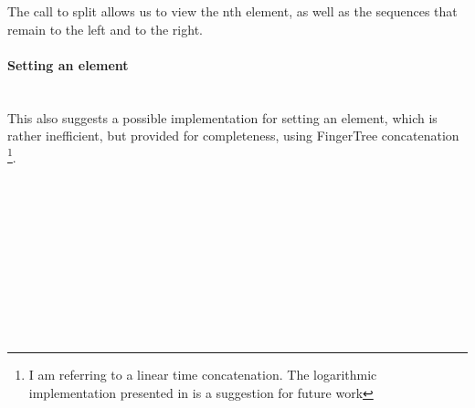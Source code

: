 \documentclass[12pt,twoside,notitlepage]{report}
\begin{document}
The call to split allows us to view the nth element, as well as the sequences that remain to the left and to the right.

\paragraph{Setting an element} \mbox{} \\
This also suggests a possible implementation for setting an element, which is rather inefficient, but provided for completeness, using FingerTree concatenation \footnote{I am referring to a linear time concatenation. The logarithmic implementation presented in \cite{fingertrees} is a suggestion for future work}.

\begin{code} 
\\
\>[0]\<[4]%
\>[4] \AgdaSymbol{:}  \AgdaSymbol{\{}\AgdaSymbol{\}\{} \AgdaSymbol{:}  \AgdaSymbol{\}\{} \AgdaSymbol{:} \AgdaSymbol{\}}            \<%
\\
\>[0]\<[4]%
\>[4]            \AgdaSymbol{)}  \<%
\\
\>[0]\<[4]%
\>[4]    \AgdaSymbol{|}  \AgdaSymbol{(}   \AgdaSymbol{)}\<%
\\
\>[4]\<[6]%
\>[6]  \AgdaSymbol{(} \AgdaSymbol{)}\<%
\\
\>[6]\<[22]%
\>[22]\AgdaSymbol{(} \AgdaSymbol{)}\<%
\\
\>[6]\<[22]%
\>[22]\AgdaSymbol{(} \AgdaSymbol{)}\<%
\\
\>[0]\<[6]%
\>[6]\AgdaSymbol{=}  \AgdaSymbol{((} \AgdaSymbol{)}  \AgdaSymbol{)} \<%
\\
\>[0]\<[4]%
\>[4]    \AgdaSymbol{|}  \AgdaSymbol{=} \<%
\\
\end{code}
\end{document}
